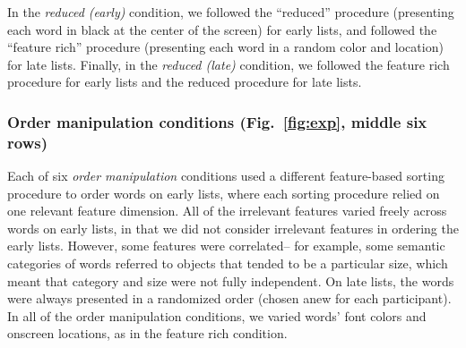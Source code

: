 \documentclass[11pt]{article}
\begin{document}
In the \textit{reduced (early)} condition, we followed the ``reduced''
procedure (presenting each word in black at the center of the screen) for early
lists, and followed the ``feature rich'' procedure (presenting each word in a
random color and location) for late lists. Finally, in the \textit{reduced
(late)} condition, we followed the feature rich procedure for early lists and
the reduced procedure for late lists.

\subsubsection*{Order manipulation conditions (Fig.~\ref{fig:exp}, middle six
rows)}

Each of six \textit{order manipulation} conditions used a different
feature-based sorting procedure to order words on early lists, where each
sorting procedure relied on one relevant feature dimension. All of the
irrelevant features varied freely across words on early lists, in that we did
not consider irrelevant features in ordering the early lists. However, some
features were correlated-- for example, some semantic categories of words
referred to objects that tended to be a particular size, which meant that
category and size were not fully independent. On late lists, the words were
always presented in a randomized order (chosen anew for each participant). In
all of the order manipulation conditions, we varied words' font colors and
onscreen locations, as in the feature rich condition.
\end{document}
